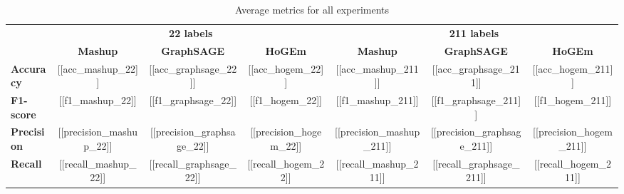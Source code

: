 \begin{table*}[h]
    \centering
    \begin{tabular}{lcccccc}
        \cline{2-7}
         & \multicolumn{3}{c}{\textbf{22 labels}} & \multicolumn{3}{c}{\textbf{211 labels}} \\ \cline{2-7}
         & \textbf{Mashup} & \textbf{GraphSAGE} & \textbf{HoGEm} & \textbf{Mashup} & \textbf{GraphSAGE} & \textbf{HoGEm} \\ \hline
        \textbf{Accuracy} & [[acc_mashup_22]] & [[acc_graphsage_22]] & [[acc_hogem_22]] & [[acc_mashup_211]] & [[acc_graphsage_211]] & [[acc_hogem_211]] \\ \hline
        \textbf{F1-score} & [[f1_mashup_22]] & [[f1_graphsage_22]] & [[f1_hogem_22]] & [[f1_mashup_211]] & [[f1_graphsage_211]] & [[f1_hogem_211]] \\ \hline
        \textbf{Precision} & [[precision_mashup_22]] & [[precision_graphsage_22]] & [[precision_hogem_22]] & [[precision_mashup_211]] & [[precision_graphsage_211]] & [[precision_hogem_211]] \\ \hline
        \textbf{Recall} & [[recall_mashup_22]] & [[recall_graphsage_22]] & [[recall_hogem_22]] & [[recall_mashup_211]] & [[recall_graphsage_211]] & [[recall_hogem_211]] \\ \hline
    \end{tabular}
    \caption{Average metrics for all experiments \label{table:metrics}}
\end{table*}